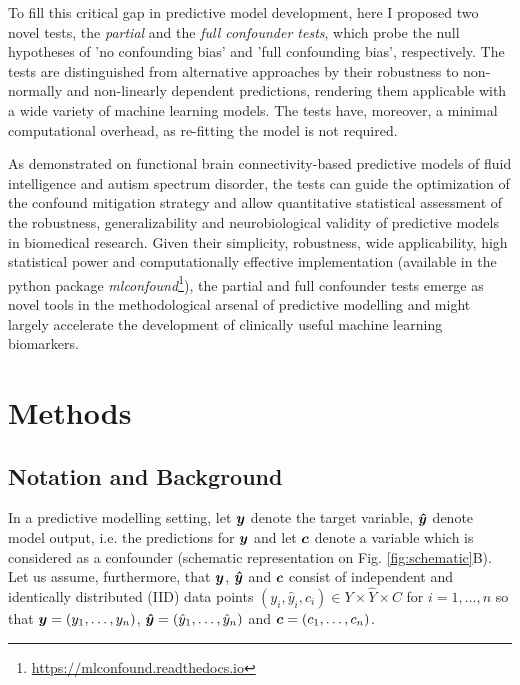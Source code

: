 \documentclass{article}
\begin{document}
To fill this critical gap in predictive model development, here I proposed two novel tests, the \emph{partial} and the \emph{full confounder tests}, which probe the null hypotheses of 'no confounding bias' and 'full confounding bias', respectively. 
The tests are distinguished from alternative approaches by their robustness to non-normally and non-linearly dependent predictions, rendering them applicable with a wide variety of machine learning models.
The tests have, moreover, a minimal computational overhead, as re-fitting the model is not required.

As demonstrated on functional brain connectivity-based predictive models of fluid intelligence and autism spectrum disorder, the tests can guide the optimization of the confound mitigation strategy and allow quantitative statistical assessment of the robustness, generalizability and neurobiological validity of predictive models in biomedical research.
Given their simplicity, robustness, wide applicability, high statistical power and computationally effective implementation (available in the  python package \emph{mlconfound}\footnote{\href{https://mlconfound.readthedocs.io}{https://mlconfound.readthedocs.io}}), the partial and full confounder tests emerge as novel tools in the methodological arsenal of predictive modelling and might largely accelerate the development of clinically useful machine learning biomarkers.

\newpage
\section{Methods}
\label{sec:methods}

\subsection{Notation and Background}

In a predictive modelling setting, let $\boldsymbol{y}$ denote the target variable, $\boldsymbol{\hat{y}}$ denote model output, i.e. the predictions for $\boldsymbol{y}$ and let $\boldsymbol{c}$ denote a variable which is considered as a confounder (schematic representation on Fig. \ref{fig:schematic}B). Let us assume, furthermore, that $\boldsymbol{y}$, $\boldsymbol{\hat{y}}$ and $\boldsymbol{c}$ consist of independent and identically distributed (IID) data points $(y_i, \hat{y}_i, c_i) \in Y \times \hat{Y} \times C$ for $i=1, \dots , n$ so that $\boldsymbol{y}=(y_1, \dots ,y_n)$, $\boldsymbol{\hat{y}}=(\hat{y}_1, \dots, \hat{y}_n)$ and $\boldsymbol{c}=(c_1, \dots, c_n)$. 
\end{document}
